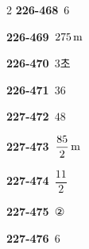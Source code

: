 \documentclass[10pt,a4paper]{article}
\begin{document}
\begin{multicols}{2}
\noindent\textbf{226-468}\ $6$\par
\noindent\textbf{226-469}\ $275\mkern3mu \mathrm{m}$\par
\noindent\textbf{226-470}\ $3$초\par
\noindent\textbf{226-471}\ $36$\par
\noindent\textbf{227-472}\ $48$\par
\noindent\textbf{227-473}\ $\dfrac{85}{2}\mkern3mu \mathrm{m}$\par
\noindent\textbf{227-474}\ $\dfrac{11}{2}$\par
\noindent\textbf{227-475}\ ②\par
\noindent\textbf{227-476}\ $6$\par
\end{multicols}
\end{document}
